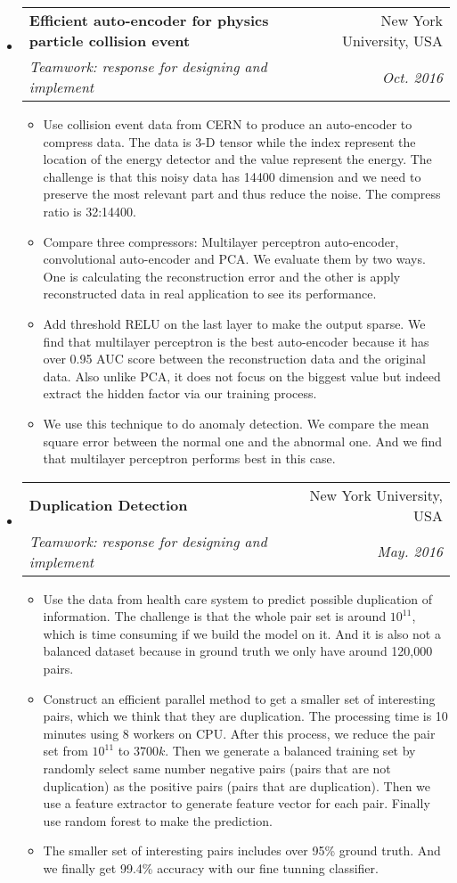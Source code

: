 \documentclass[a4paper,11pt]{article}
\makeatletter
\newcommand{\resitem}[1]{\item #1 \vspace{-2pt}}
\renewcommand{\normalsize}{\fontsize{12pt}{\baselineskip}\selectfont}
\newcommand{\ressubheading}[4]{
	\begin{tabular*}{6.5in}{l@{\extracolsep{\fill}}r}
		\textbf{#1} & #2 \\
		\textit{#3} & \textit{#4} \\
	\end{tabular*}\vspace{-6pt}}
\makeatother
\begin{document}
\begin{itemize}
				\item \ressubheading{{\normalsize Efficient auto-encoder for physics particle collision event}}{New York University, USA}{\normalsize Teamwork: response for designing and implement}{Oct. 2016}
				
				\begin{itemize}
					\resitem{Use collision event data from CERN to produce an auto-encoder to compress data. The data is 3-D tensor while the index represent the location of the energy detector and the value represent the energy. The challenge is that this noisy data has 14400 dimension and we need to preserve the most relevant part and thus reduce the noise. The compress ratio is 32:14400.}
					\resitem{Compare three compressors: Multilayer perceptron auto-encoder, convolutional auto-encoder and PCA. We evaluate them by two ways. One is calculating the reconstruction error and the other is apply reconstructed data in real application to see its performance.}
					\resitem{Add threshold RELU on the last layer to make the output sparse. We find that multilayer perceptron is the best auto-encoder because it has over 0.95 AUC score between the reconstruction data and the original data. Also unlike PCA, it does not focus on the biggest value but indeed extract the hidden factor via our training process.}
					\resitem{We use this technique to do anomaly detection. We compare the mean square error between the normal one and the abnormal one. And we find that multilayer perceptron performs best in this case.}
				\end{itemize}
			\item \ressubheading{\normalsize Duplication Detection}{New York University, USA}{\normalsize Teamwork: response for designing and implement}{May. 2016}
			
			\begin{itemize}
				\resitem{Use the data from health care system to predict possible duplication of information. The challenge is that the whole pair set is around $ 10^{11} $, which is time consuming if we build the model on it. And it is also not a balanced dataset because in ground truth we only have around 120,000 pairs.}
				\resitem{Construct an efficient parallel method to get a smaller set of interesting pairs, which we think that they are duplication. The processing time is 10 minutes using 8 workers on CPU. After this process, we reduce the pair set from $ 10^{11} $ to $ 3700k $. Then we generate a balanced training set by randomly select same number negative pairs (pairs that are not duplication) as the positive pairs (pairs that are duplication). Then we use a feature extractor to generate feature vector for each pair. Finally use random forest to make the prediction.}
				\resitem{The smaller set of interesting pairs includes over 95\% ground truth. And we finally get 99.4\% accuracy with our fine tunning classifier.} 
			\end{itemize}
				\newpage
				

\end{itemize}
\end{document}
